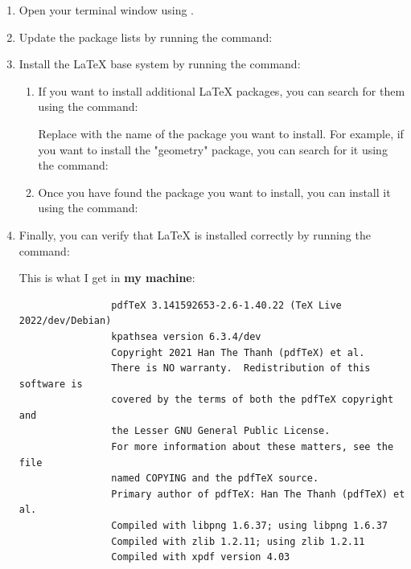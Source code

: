 \documentclass[12pt]{article}
\begin{document}
	\begin{enumerate}
		\item Open your terminal window using .
		\item Update the package lists by running the command:
		
		
		\item Install the LaTeX base system by running the command:
		
		
		\begin{enumerate}
			\item If you want to install additional LaTeX packages, you can search for them using the command:
			
			
			Replace with the name of the package you want to install. For example, if you want to install the "geometry" package, you can search for it using the command:
			
			
			\item Once you have found the package you want to install, you can install it using the command:
			
		\end{enumerate}
	    
	    \item Finally, you can verify that LaTeX is installed correctly by running the command:
	    
	    
	    This is what I get in \textbf{my machine}:
	    
	    \begin{mdframed}[style=myboxstyleTerminal1]
	    	\begin{verbatim}
	    		pdfTeX 3.141592653-2.6-1.40.22 (TeX Live 2022/dev/Debian)
	    		kpathsea version 6.3.4/dev
	    		Copyright 2021 Han The Thanh (pdfTeX) et al.
	    		There is NO warranty.  Redistribution of this software is
	    		covered by the terms of both the pdfTeX copyright and
	    		the Lesser GNU General Public License.
	    		For more information about these matters, see the file
	    		named COPYING and the pdfTeX source.
	    		Primary author of pdfTeX: Han The Thanh (pdfTeX) et al.
	    		Compiled with libpng 1.6.37; using libpng 1.6.37
	    		Compiled with zlib 1.2.11; using zlib 1.2.11
	    		Compiled with xpdf version 4.03
	    	\end{verbatim}
	    \end{mdframed} 
	\end{enumerate}
	
\end{document}
